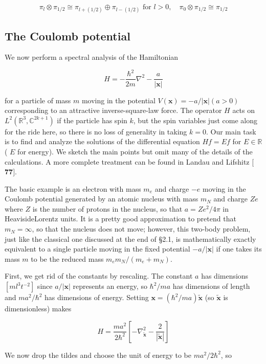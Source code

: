 \documentclass[10pt, letterpaper]{article}
\begin{document}
$$
\pi_{l} \otimes \pi_{1 / 2} \cong \pi_{l+(1 / 2)} \oplus \pi_{l-(1 / 2)} \text { for } l>0, \quad \pi_{0} \otimes \pi_{1 / 2} \cong \pi_{1 / 2}
$$

\subsection*{The Coulomb potential}
We now perform a spectral analysis of the Hamiltonian

$$
H=-\frac{\hbar^{2}}{2 m} \nabla^{2}-\frac{a}{|\mathbf{x}|}
$$

for a particle of mass $m$ moving in the potential $V(\mathbf{x})=-a /|\mathbf{x}|(a>0)$ corresponding to an attractive inverse-square-law force. The operator $H$ acts on $L^{2}\left(\mathbb{R}^{3}, \mathbb{C}^{2 k+1}\right)$ if the particle has spin $k$, but the spin variables just come along for the ride here, so there is no loss of generality in taking $k=0$. Our main task is to find and analyze the solutions of the differential equation $H f=E f$ for $E \in \mathbb{R}$ ( $E$ for energy). We sketch the main points but omit many of the details of the calculations. A more complete treatment can be found in Landau and Lifshitz [ $\mathbf{7 7 ]}$.

The basic example is an electron with mass $m_{e}$ and charge $-e$ moving in the Coulomb potential generated by an atomic nucleus with mass $m_{N}$ and charge $Z e$ where $Z$ is the number of protons in the nucleus, so that $a=Z e^{2} / 4 \pi$ in HeavisideLorentz units. It is a pretty good approximation to pretend that $m_{N}=\infty$, so that the nucleus does not move; however, this two-body problem, just like the classical one discussed at the end of §2.1, is mathematically exactly equivalent to a single particle moving in the fixed potential $-a /|\mathbf{x}|$ if one takes its mass $m$ to be the reduced mass $m_{e} m_{N} /\left(m_{e}+m_{N}\right)$.

First, we get rid of the constants by rescaling. The constant $a$ has dimensions $\left[m l^{3} t^{-2}\right]$ since $a /|\mathbf{x}|$ represents an energy, so $\hbar^{2} / m a$ has dimensions of length and $m a^{2} / \hbar^{2}$ has dimensions of energy. Setting $\mathbf{x}=\left(\hbar^{2} / m a\right) \widetilde{\mathbf{x}}$ (so $\widetilde{\mathbf{x}}$ is dimensionless) makes

$$
H=\frac{m a^{2}}{2 \hbar^{2}}\left[-\nabla_{\widetilde{\mathbf{x}}}^{2}-\frac{2}{|\widetilde{\mathbf{x}}|}\right]
$$

We now drop the tildes and choose the unit of energy to be $m a^{2} / 2 \hbar^{2}$, so
\end{document}
